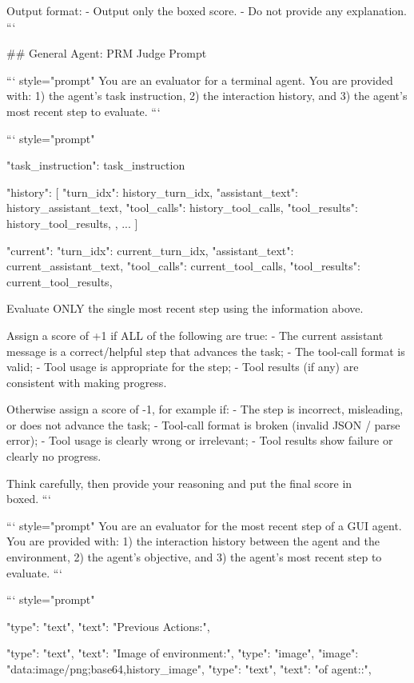 Output format:
- Output only the boxed score.
- Do not provide any explanation.
```

## General Agent: PRM Judge Prompt


``` {style="prompt"}
You are an evaluator for a terminal agent.
You are provided with:
1) the agent's task instruction,
2) the interaction history, and
3) the agent's most recent step to evaluate.
```


``` {style="prompt"}

"task_instruction": {task_instruction}

"history": [
{
  "turn_idx": {history_turn_idx},
  "assistant_text": {history_assistant_text},
  "tool_calls": {history_tool_calls},
  "tool_results": {history_tool_results},
},
...
]

"current": {
  "turn_idx": {current_turn_idx},
  "assistant_text": {current_assistant_text},
  "tool_calls": {current_tool_calls},
  "tool_results": {current_tool_results},
}

Evaluate ONLY the single most recent step using the information above.


Assign a score of +1 if ALL of the following are true:
- The current assistant message is a correct/helpful step that advances the task;
- The tool-call format is valid;
- Tool usage is appropriate for the step;
- Tool results (if any) are consistent with making progress.

Otherwise assign a score of -1, for example if:
- The step is incorrect, misleading, or does not advance the task;
- Tool-call format is broken (invalid JSON / parse error);
- Tool usage is clearly wrong or irrelevant;
- Tool results show failure or clearly no progress.

Think carefully, then provide your reasoning and put the final score in \\boxed{}.
```


``` {style="prompt"}
You are an evaluator for the most recent step of a GUI agent.
You are provided with:
1) the interaction history between the agent and the environment,
2) the agent's objective, and
3) the agent's most recent step to evaluate.
```


``` {style="prompt"}

{"type": "text", "text": "Previous Actions:\n"},

{"type": "text", "text": "Image of environment:\n"},
{"type": "image", "image": "data:image/png;base64,{history_image}"},
{"type": "text", "text": "\nAction of agent::\n"},

